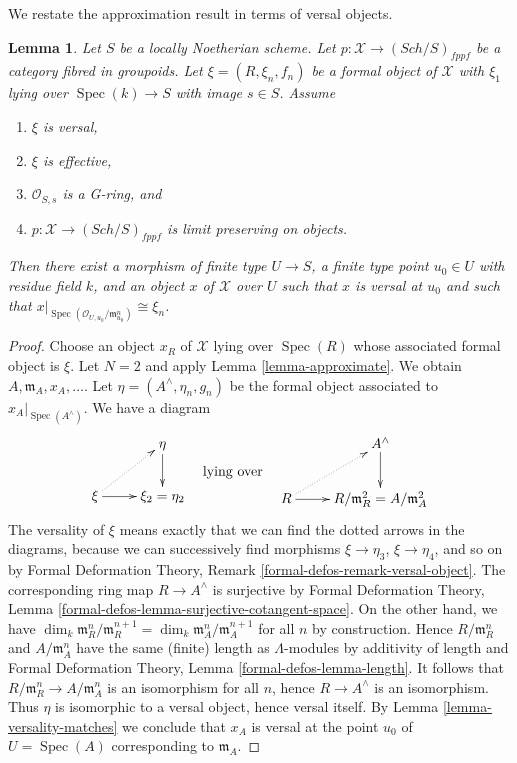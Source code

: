 \documentclass{stacks-project}
\theoremstyle{plain}
\newtheorem{lemma}[subsection]{Lemma}
\theoremstyle{definition}
\theoremstyle{remark}
\numberwithin{equation}{subsection}
\def\Spec{\mathop{\mathrm{Spec}}}
\def\Sch{\mathit{Sch}}
\begin{document}
\noindent
We restate the approximation result in terms of
versal objects.

\begin{lemma}
\label{lemma-approximate-versal}
Let $S$ be a locally Noetherian scheme. Let
$p : \mathcal{X} \to (\Sch/S)_{fppf}$ be a category fibred in groupoids.
Let $\xi = (R, \xi_n, f_n)$ be a formal object of $\mathcal{X}$ with
$\xi_1$ lying over $\Spec(k) \to S$ with image $s \in S$. Assume
\begin{enumerate}
\item $\xi$ is versal,
\item $\xi$ is effective,
\item $\mathcal{O}_{S, s}$ is a G-ring, and
\item $p : \mathcal{X} \to (\Sch/S)_{fppf}$ is limit preserving on objects.
\end{enumerate}
Then there exist a morphism of finite type $U \to S$, a finite type
point $u_0 \in U$ with residue field $k$, and an object $x$ of $\mathcal{X}$
over $U$ such that $x$ is versal at $u_0$ and such that
$x|_{\Spec(\mathcal{O}_{U, u_0}/\mathfrak m_{u_0}^n)} \cong \xi_n$.
\end{lemma}

\begin{proof}
Choose an object $x_R$ of $\mathcal{X}$ lying over $\Spec(R)$ whose associated
formal object is $\xi$. Let $N = 2$ and apply Lemma \ref{lemma-approximate}.
We obtain $A, \mathfrak m_A, x_A, \ldots$.
Let $\eta = (A^\wedge, \eta_n, g_n)$ be the formal object associated to
$x_A|_{\Spec(A^\wedge)}$. We have a diagram
$$
\vcenter{
\xymatrix{
& \eta \ar[d] \\
\xi \ar[r] \ar@{..>}[ru] & \xi_2 = \eta_2
}
}
\quad\text{lying over}\quad
\vcenter{
\xymatrix{
& A^\wedge \ar[d] \\
R \ar[r] \ar@{..>}[ru] & R/\mathfrak m_R^2 = A/\mathfrak m_A^2
}
}
$$
The versality of $\xi$ means exactly that we can find the
dotted arrows in the diagrams, because we can successively find
morphisms $\xi \to \eta_3$, $\xi \to \eta_4$, and so on by
Formal Deformation Theory, Remark \ref{formal-defos-remark-versal-object}.
The corresponding ring map $R \to A^\wedge$ is surjective by
Formal Deformation Theory, Lemma
\ref{formal-defos-lemma-surjective-cotangent-space}.
On the other hand, we have
$\dim_k \mathfrak m_R^n/\mathfrak m_R^{n + 1} =
\dim_k \mathfrak m_A^n/\mathfrak m_A^{n + 1}$ for all $n$ by construction.
Hence $R/\mathfrak m_R^n$ and $A/\mathfrak m_A^n$ have the same (finite)
length as $\Lambda$-modules by additivity of length and
Formal Deformation Theory, Lemma \ref{formal-defos-lemma-length}.
It follows that $R/\mathfrak m_R^n \to A/\mathfrak m_A^n$ is an isomorphism
for all $n$, hence $R \to A^\wedge$ is an isomorphism. Thus $\eta$ is
isomorphic to a versal object, hence versal itself. By
Lemma \ref{lemma-versality-matches}
we conclude that $x_A$ is versal at the point $u_0$ of
$U = \Spec(A)$ corresponding to $\mathfrak m_A$.
\end{proof}
\end{document}
